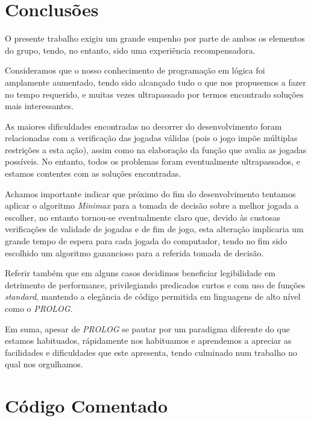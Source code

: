 \documentclass[a4paper]{article}
\begin{document}
\clearpage
\newpage
\newpage

\section{Conclusões}
O presente trabalho exigiu um grande empenho por parte de ambos os elementos do grupo, tendo, no entanto, sido uma experiência recompensadora.

Consideramos que o nosso conhecimento de programação em lógica foi amplamente aumentado, tendo sido alcançado tudo o que nos propusemos a fazer no tempo requerido, e muitas vezes ultrapassado por termos encontrado soluções mais interessantes.

As maiores dificuldades encontradas no decorrer do desenvolvimento foram relacionadas com a verificação das jogadas válidas (pois o jogo impõe múltiplas restrições a esta ação), assim como na elaboração da função que avalia as jogadas possíveis. No entanto, todos os problemas foram eventualmente ultrapassados, e estamos contentes com as soluções encontradas.

Achamos importante indicar que próximo do fim do desenvolvimento tentamos aplicar o algoritmo \textit{Minimax} para a tomada de decisão sobre a melhor jogada a escolher, no entanto tornou-se eventualmente claro que, devido às custosas verificações de validade de jogadas e de fim de jogo, esta alteração implicaria um grande tempo de espera para cada jogada do computador, tendo no fim sido escolhido um algoritmo ganancioso para a referida tomada de decisão.

Referir também que em alguns casos decidimos beneficiar legibilidade em detrimento de performance, privilegiando predicados curtos e com uso de funções \textit{standard}, mantendo a elegância de código permitida em linguagens de alto nível como o \textit{PROLOG}.

Em suma, apesar de \textit{PROLOG} se pautar por um paradigma diferente do que estamos habituados, rápidamente nos habituamos e aprendemos a apreciar as facilidades e dificuldades que este apresenta, tendo culminado num trabalho no qual nos orgulhamos.


\clearpage
{}
\renewcommand\refname{Bibliografia}




\newpage
\appendix
\section{Código Comentado}
\end{document}

